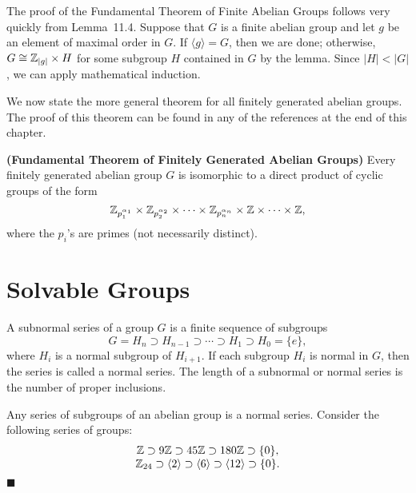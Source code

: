  
The proof of the Fundamental Theorem of Finite Abelian Groups follows
very quickly from Lemma~11.4.  Suppose that $G$ is a finite abelian
group and let $g$ be an element of maximal order in $G$. If $\langle g
\rangle = G$, then we are done; otherwise, $G \cong {\Bbb Z}_{|g|}
\times H$ for some subgroup $H$ contained in $G$ by the lemma.  Since
$|H| < |G|$, we can apply mathematical induction.  
 
 
We now state the more general theorem for all finitely generated
abelian groups.  The proof of this theorem can be found in any of the 
references at the end of this chapter.
 
 
\begin{theorem}
{\bf (Fundamental Theorem of Finitely Generated Abelian Groups)}
Every finitely generated abelian group $G$ is isomorphic to a direct
product of cyclic groups of the form 
\[
{\Bbb Z}_{p_1^{ \alpha_1 }}
\times
{\Bbb Z}_{p_2^{ \alpha_2 }}
\times
\cdots
\times
{\Bbb Z}_{p_n^{ \alpha_n }}
\times
{\Bbb Z}
\times \cdots \times
{\Bbb Z},
\]
where the $p_i$'s are primes (not necessarily distinct).
\end{theorem}
 
 
 
\section{Solvable Groups}
 
 
 
A {\bfi subnormal series\/} 
of a group $G$ is a finite sequence of subgroups 
\[
G = H_n \supset H_{n-1} \supset \cdots \supset H_1 \supset
H_0 = \{ e \},
\]
where $H_i$ is a normal subgroup of $H_{i+1}$. If each subgroup $H_i$
is normal in $G$, then the series is called a {\bfi normal
series}. The {\bfi length\/} of a 
subnormal or normal series is the number of proper inclusions. 
 
 
\vspace{2ex}
 
 
Any series of subgroups of an abelian group is a normal series.
Consider the following  series of groups: 
\[
\begin{array}{c}
{\Bbb Z} \supset 9{\Bbb Z} \supset 45{\Bbb Z} \supset 180{\Bbb Z} 
\supset \{0\}, \\
{\Bbb Z}_{24} \supset \langle 2 \rangle \supset \langle 6 \rangle 
\supset \langle 12 \rangle
\supset \{0\}.
\end{array}
\]
\hspace{\fill} $\blacksquare$
 
